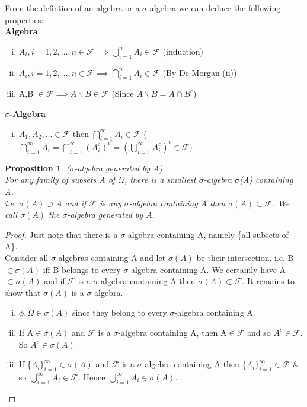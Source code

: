 \documentclass[12pt]{article}
\newtheorem{prop}{Proposition}
\begin{document}
From the defintion of an algebra or a $\sigma$-algebra we can deduce the following properties:
\vspace{20pt}\\
{\bf Algebra}
\begin{enumerate}[(i)]
  \item $A_{i}, i=1,2,\dots,n \in \mathcal{F} \implies \bigcup_{i=1}^{n} A_{i} \in \mathcal{F}$ (induction)
  \item  $A_{i}, i=1,2,\dots,n \in \mathcal{F} \implies \bigcap_{i=1}^{n} A_{i} \in \mathcal{F}$ (By De Morgan (ii))
  \item A,B $\in \mathcal{F} \implies A\backslash B\in \mathcal{F}$ (Since $A\backslash B=A\cap B^{c}$)
\end{enumerate}

\vspace{12pt}
{\bf $\sigma$-Algebra}
\begin{enumerate}[(i)]
  \item  $A_{1}, A_{2},\dots \in \mathcal{F}$ then $\bigcap_{i=1}^{\infty} A_{i} \in \mathcal{F}$  ($\bigcap_{i=1}^{\infty} A_{i} = \bigcap_{i=1}^{\infty}( A_{i}^{c})^{c}= (\bigcup_{i=1}^{\infty} A_{i}^{c})^{c}\in \mathcal{F})$
\end{enumerate}
\vspace{12pt}
\begin{prop}($\sigma$-algebra generated by A)\\ For any family of subsets A of $\Omega$, there is a smallest $\sigma$-algebra $\sigma$(A) containing A.\\ i.e. $\sigma(A) \supset A$ and if $\mathcal{F}$ is any $\sigma$-algebra containing A then 
$\sigma(A)\subset\mathcal{F}$. We call $\sigma(A)$ the $\sigma$-algebra generated by A.
\end{prop}

\begin{proof}
Just note that there is a $\sigma$-algebra containing A, namely \{all subsets of A\}.\\ Consider all $\sigma$-algebras containing A and let $\sigma(A)$ be their intersection. i.e. B$\in\sigma(A)$ iff B belongs to every $\sigma$-algebra containing A. We certainly have A$\subset\sigma(A)$ and if $\mathcal{F}$ is a $\sigma$-algebra containing A then $\sigma(A)\subset\mathcal{F}$. It remains to show that $\sigma(A)$ is a $\sigma$-algebra.
\begin{enumerate}[(i)]
  \item $\phi, \Omega \in \sigma(A)$ since they belong to every $\sigma$-algebra containing A.
  \item  If A$\in \sigma(A)$ and $\mathcal{F}$ is a $\sigma$-algebra containing A, then A$\in \mathcal{F}$ and so $A^{c}\in\mathcal{F}$.\\ So $A^{c}\in\sigma(A)$
  \item If \{$A_{i}\}_{i=1}^{\infty}\in\sigma(A)$ and $\mathcal{F}$ is a $\sigma$-algebra containing A then  \{$A_{i}\}_{i=1}^{\infty}\in\mathcal{F}$ \& so $\bigcup_{i=1}^{\infty} A_{i}\in\mathcal{F}$. Hence $\bigcup_{i=1}^{\infty} A_{i}\in\sigma(A)$.
\end{enumerate}
\end{proof}
\end{document}
